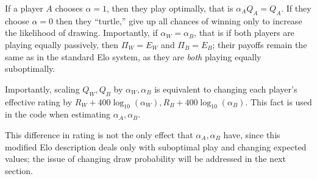 \documentclass{article}
\begin{document}
If a player $A$ chooses $\alpha=1$, then they play optimally, that is
$\alpha_A Q_A = Q_A$.
If they choose $\alpha=0$ then they ``turtle,''
give up all chances of winning only to increase the likelihood of drawing.
Importantly, if $\alpha_W=\alpha_B$, that is if both players are playing
equally passively, then $\Pi_W=E_W$ and $\Pi_B=E_B$; their payoffs
remain the same as in the standard Elo system, as they are \textit{both}
playing equally suboptimally.

Importantly, scaling $Q_W,Q_B$ by $\alpha_W,\alpha_B$ is equivalent to changing
each player's effective rating by $R_W + 400\log_{10}(\alpha_W),R_B + 400\log_{10}(\alpha_B)$.
This fact is used in the code when estimating $\alpha_A, \alpha_B$.

This difference in rating is not the only effect that $\alpha_A,\alpha_B$ have,
since this modified Elo description deals only with suboptimal play and changing expected values;
the issue of changing draw probability will be addressed in the next section.
\end{document}
